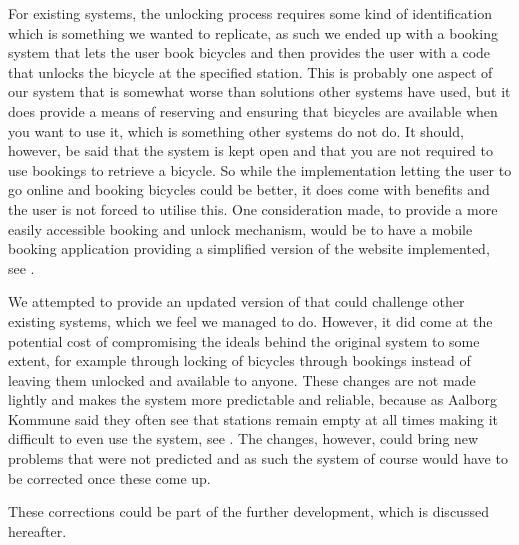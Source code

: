 For existing systems, the unlocking process requires some kind of identification which is something we wanted to replicate, as such we ended up with a booking system that lets the user book bicycles and then provides the user with a code that unlocks the bicycle at the specified station.
This is probably one aspect of our system that is somewhat worse than solutions other systems have used, but it does provide a means of reserving and ensuring that bicycles are available when you want to use it, which is something other systems do not do. 
It should, however, be said that the system is kept open and that you are not required to use bookings to retrieve a bicycle.
So while the implementation letting the user to go online and booking bicycles could be better, it does come with benefits and the user is not forced to utilise this.
One consideration made, to provide a more easily accessible booking and unlock mechanism, would be to have a mobile booking application providing a simplified version of the website implemented, see .

We attempted to provide an updated version of \bycykel that could challenge other existing systems, which we feel we managed to do. 
However, it did come at the potential cost of compromising the ideals behind the original system to some extent, for example through locking of bicycles through bookings instead of leaving them unlocked and available to anyone. 
These changes are not made lightly and makes the system more predictable and reliable, because as Aalborg Kommune said they often see that stations remain empty at all times making it difficult to even use the system, see . 
The changes, however, could bring new problems that were not predicted and as such the system of course would have to be corrected once these come up.

These corrections could be part of the further development, which is discussed hereafter.
